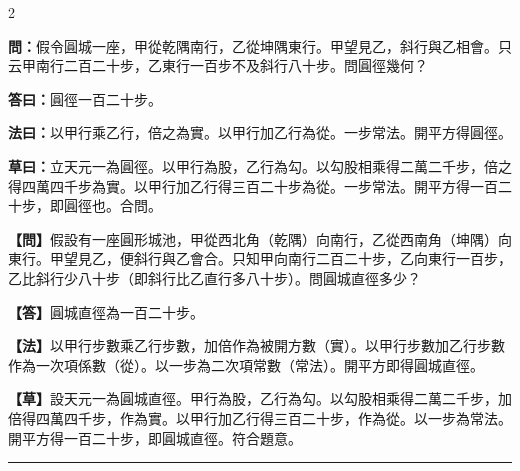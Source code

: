 \documentclass[11pt,a4paper]{article}
\newcommand{\longline}{\noindent\rule{\textwidth}{0.4pt}}
\newcommand{\wenC}[1]{\par\noindent\textbf{\textcolor{probcolor}{問：}}{#1}\par}
\newcommand{\daC}[1]{\par\noindent\textbf{\textcolor{anscolor}{答曰：}}{#1}\par}
\newcommand{\fayueC}[1]{\par\noindent\textbf{\textcolor{methodcolor}{法曰：}}{#1}\par}
\newcommand{\caoyueC}[1]{\par\noindent\textbf{草曰：}{#1}\par}
\newcommand{\wenM}[1]{\par\noindent\textbf{\textcolor{probcolor}{【問】}}{#1}\par}
\newcommand{\daM}[1]{\par\noindent\textbf{\textcolor{anscolor}{【答】}}{#1}\par}
\newcommand{\fayueM}[1]{\par\noindent\textbf{\textcolor{methodcolor}{【法】}}{#1}\par}
\newcommand{\caoyueM}[1]{\par\noindent\textbf{【草】}{#1}\par}
\begin{document}
\begin{paracol}{2}

\wenC{假令圓城一座，甲從乾隅南行，乙從坤隅東行。甲望見乙，斜行與乙相會。只云甲南行二百二十步，乙東行一百步不及斜行八十步。問圓徑幾何？}

\daC{圓徑一百二十步。}

\fayueC{以甲行乘乙行，倍之為實。以甲行加乙行為從。一步常法。開平方得圓徑。}

\caoyueC{立天元一為圓徑。以甲行為股，乙行為勾。以勾股相乘得二萬二千步，倍之得四萬四千步為實。以甲行加乙行得三百二十步為從。一步常法。開平方得一百二十步，即圓徑也。合問。}

\switchcolumn

\wenM{假設有一座圓形城池，甲從西北角（乾隅）向南行，乙從西南角（坤隅）向東行。甲望見乙，便斜行與乙會合。只知甲向南行二百二十步，乙向東行一百步，乙比斜行少八十步（即斜行比乙直行多八十步）。問圓城直徑多少？}

\daM{圓城直徑為一百二十步。}

\fayueM{以甲行步數乘乙行步數，加倍作為被開方數（實）。以甲行步數加乙行步數作為一次項係數（從）。以一步為二次項常數（常法）。開平方即得圓城直徑。}

\caoyueM{設天元一為圓城直徑。甲行為股，乙行為勾。以勾股相乘得二萬二千步，加倍得四萬四千步，作為實。以甲行加乙行得三百二十步，作為從。以一步為常法。開平方得一百二十步，即圓城直徑。符合題意。}

\end{paracol}

\vspace{0.3cm}
\longline
\end{document}
